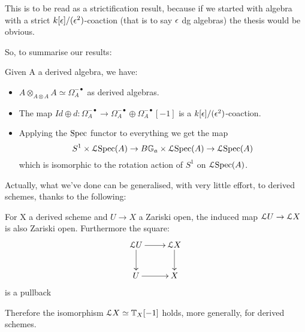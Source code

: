 \begin{refsection}
\begin{remark}
This is to be read as a strictification result, because if we started with algebra with a strict $k[\epsilon]/(\epsilon^2)$-coaction (that is to say $\epsilon$ dg algebras) the thesis would be
obvious.
\end{remark}

So, to summarise our results:

\begin{theorem} Given A a derived algebra, we have:
\begin{itemize}
 \item $A\otimes_{A\otimes A}A\simeq \Omega_A^{-\bullet}$ as derived algebras.
 \item The map $Id\oplus d:\Omega_A^{-\bullet}\to\Omega_A^{-\bullet}\oplus \Omega_A^{-\bullet}[-1]$ is a
 $k[\epsilon]/(\epsilon^2)$-coaction.
\item Applying the $\mathrm{Spec}$ functor to everything we get the map $$S^1\times \mathcal{L}\mathrm{Spec}(A)\to B\mathbb{G}_a\times \mathcal{L} \mathrm{Spec}(A)\to\mathcal{L}\mathrm{Spec}(A)$$ which is isomorphic to
the rotation action of $S^1$ on $\mathcal{L} \mathrm{Spec}(A)$.
\end{itemize}
\end{theorem}

Actually, what we've done can be generalised, with very little effort, to derived schemes, thanks to the following:

\begin{proposition} \cite{Be-Na}
For X a derived scheme and $U\to X$ a Zariski open, the induced map $\mathcal{L} U\to \mathcal{L} X$
is also Zariski open. Furthermore the square:
\begin{displaymath}
\xymatrix{
\L U \ar[r] \ar[d] &  \L X \ar[d]\\
 U \ar[r] & X\\
}
\end{displaymath}
is a pullback
\end{proposition}

Therefore the isomorphism $\mathcal{L} X\simeq \mathbb{T}_X[-1]$ holds, more generally, for derived schemes.

\printbibliography[heading = local]

\end{refsection}

